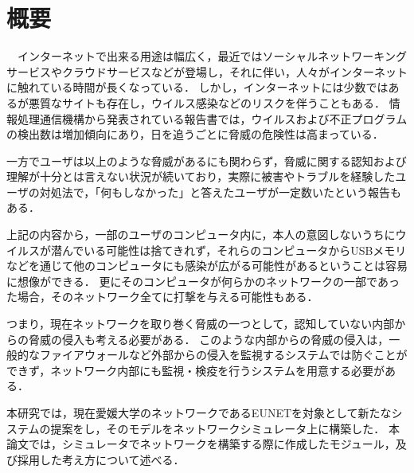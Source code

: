 \chapter*{概要}

　インターネットで出来る用途は幅広く，最近ではソーシャルネットワーキングサービスやクラウドサービスなどが登場し，それに伴い，人々がインターネットに触れている時間が長くなっている．
しかし，インターネットには少数ではあるが悪質なサイトも存在し，ウイルス感染などのリスクを伴うこともある．
情報処理通信機構から発表されている報告書では，ウイルスおよび不正プログラムの検出数は増加傾向にあり\cite{joron2}，日を追うごとに脅威の危険性は高まっている．

一方でユーザは以上のような脅威があるにも関わらず，脅威に関する認知および理解が十分とは言えない状況が続いており，実際に被害やトラブルを経験したユーザの対処法で，「何もしなかった」と答えたユーザが一定数いたという報告もある\cite{joron1}．

上記の内容から，一部のユーザのコンピュータ内に，本人の意図しないうちにウイルスが潜んでいる可能性は捨てきれず，それらのコンピュータからUSBメモリなどを通じて他のコンピュータにも感染が広がる可能性があるということは容易に想像ができる．
更にそのコンピュータが何らかのネットワークの一部であった場合，そのネットワーク全てに打撃を与える可能性もある．

つまり，現在ネットワークを取り巻く脅威の一つとして，認知していない内部からの脅威の侵入も考える必要がある．
このような内部からの脅威の侵入は，一般的なファイアウォールなど外部からの侵入を監視するシステムでは防ぐことができず，ネットワーク内部にも監視・検疫を行うシステムを用意する必要がある．

本研究では，現在愛媛大学のネットワークであるEUNETを対象として新たなシステムの提案をし，そのモデルをネットワークシミュレータ上に構築した．
本論文では，シミュレータでネットワークを構築する際に作成したモジュール，及び採用した考え方について述べる．